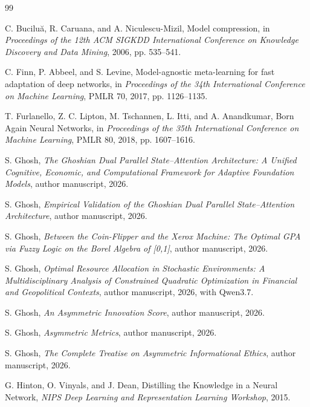 \documentclass[11pt,a4paper]{article}
\begin{document}
\begin{thebibliography}{99}

C. Bucilu\u{a}, R. Caruana, and A. Niculescu-Mizil,
\newblock Model compression,
\newblock in \emph{Proceedings of the 12th ACM SIGKDD International Conference on Knowledge Discovery and Data Mining}, 2006, pp. 535--541.

C. Finn, P. Abbeel, and S. Levine,
\newblock Model-agnostic meta-learning for fast adaptation of deep networks,
\newblock in \emph{Proceedings of the 34th International Conference on Machine Learning}, PMLR 70, 2017, pp. 1126--1135.

T. Furlanello, Z. C. Lipton, M. Tschannen, L. Itti, and A. Anandkumar,
\newblock Born Again Neural Networks,
\newblock in \emph{Proceedings of the 35th International Conference on Machine Learning}, PMLR 80, 2018, pp. 1607--1616.

S. Ghosh,
\newblock \emph{The Ghoshian Dual Parallel State--Attention Architecture: A Unified Cognitive, Economic, and Computational Framework for Adaptive Foundation Models},
\newblock author manuscript, 2026.

S. Ghosh,
\newblock \emph{Empirical Validation of the Ghoshian Dual Parallel State--Attention Architecture},
\newblock author manuscript, 2026.

S. Ghosh,
\newblock \emph{Between the Coin-Flipper and the Xerox Machine: The Optimal GPA via Fuzzy Logic on the Borel Algebra of [0,1]},
\newblock author manuscript, 2026.

S. Ghosh,
\newblock \emph{Optimal Resource Allocation in Stochastic Environments: A Multidisciplinary Analysis of Constrained Quadratic Optimization in Financial and Geopolitical Contexts},
\newblock author manuscript, 2026, with Qwen3.7.

S. Ghosh,
\newblock \emph{An Asymmetric Innovation Score},
\newblock author manuscript, 2026.

S. Ghosh,
\newblock \emph{Asymmetric Metrics},
\newblock author manuscript, 2026.

S. Ghosh,
\newblock \emph{The Complete Treatise on Asymmetric Informational Ethics},
\newblock author manuscript, 2026.

G. Hinton, O. Vinyals, and J. Dean,
\newblock Distilling the Knowledge in a Neural Network,
\newblock \emph{NIPS Deep Learning and Representation Learning Workshop}, 2015.


\end{thebibliography}
\end{document}
